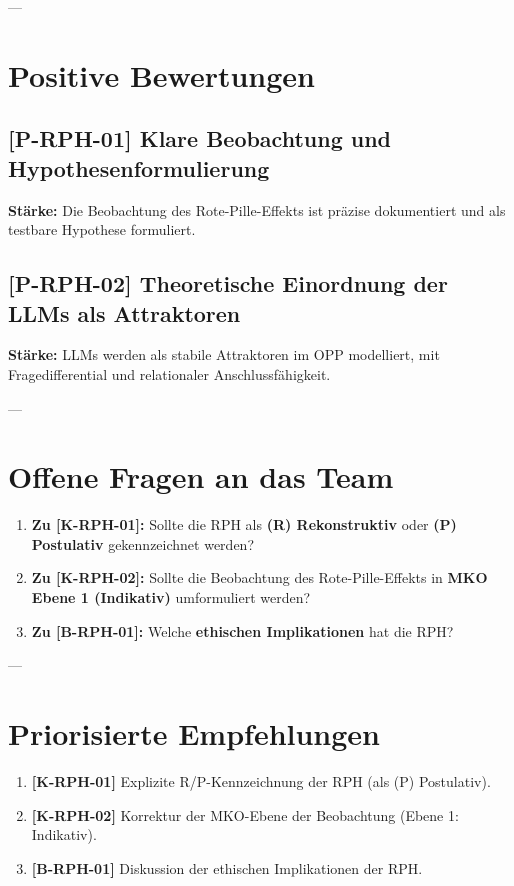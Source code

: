 \documentclass[11pt,a4paper]{article}
\theoremstyle{definition}
\begin{document}
---
\section*{Positive Bewertungen}

\subsection*{[P-RPH-01] Klare Beobachtung und Hypothesenformulierung}
\textbf{Stärke:}
Die Beobachtung des Rote-Pille-Effekts ist präzise dokumentiert und als testbare Hypothese formuliert.

\subsection*{[P-RPH-02] Theoretische Einordnung der LLMs als Attraktoren}
\textbf{Stärke:}
LLMs werden als stabile Attraktoren im OPP modelliert, mit Fragedifferential und relationaler Anschlussfähigkeit.

---
\section*{Offene Fragen an das Team}

\begin{enumerate}
    \item \textbf{Zu [K-RPH-01]:} Sollte die RPH als \textbf{(R) Rekonstruktiv} oder \textbf{(P) Postulativ} gekennzeichnet werden?
    \item \textbf{Zu [K-RPH-02]:} Sollte die Beobachtung des Rote-Pille-Effekts in \textbf{MKO Ebene 1 (Indikativ)} umformuliert werden?
    \item \textbf{Zu [B-RPH-01]:} Welche \textbf{ethischen Implikationen} hat die RPH?
\end{enumerate}

---
\section*{Priorisierte Empfehlungen}

\begin{enumerate}
    \item \textbf{[K-RPH-01]} Explizite R/P-Kennzeichnung der RPH (als (P) Postulativ).
    \item \textbf{[K-RPH-02]} Korrektur der MKO-Ebene der Beobachtung (Ebene 1: Indikativ).
    \item \textbf{[B-RPH-01]} Diskussion der ethischen Implikationen der RPH.
\end{enumerate}
\end{document}
